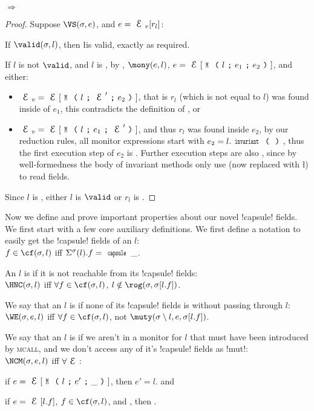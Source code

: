 \begin{theorem}\rm {} $\Rightarrow$ 
\end{theorem}\SS
\begin{proof}
\noindent Suppose $\VS(\s, e)$, and $e = \EV[r_l]$:
\begin{ienumerate}
	\item If $\valid(\s,l)$, then \l is valid, exactly as required.
	\item If $l$ is not $\valid$, and $l$ is \reach, by , $\mony(e,l)$, $e = \E[\M{l}{e_1}{e_2}]$, and either:
	\begin{itemize}
	 \item $\EV = \E[\M{l}{\E'}{e_2}]$, that is $r_l$ (which is not equal to $l$) was found inside of $e_1$, this contradicts the definition of \mony, or
	 \item $\EV = \E[\M{l}{e_1}{\E'}]$, and thus $r_l$ was found inside $e_2$,  by our reduction rules, all monitor expressions start with $e_2=l.\invariant$, thus the first execution step
	 of $e_2$ is \trusted. Further execution steps are also \trusted, since by well-formedness the body of invariant methods only use \Q@this@ (now replaced with \l) to read fields.
	\end{itemize}
\end{ienumerate}
Since $l$ is \reach, either $l$ is $\valid$ or $r_l$ is \trusted.
\end{proof}

Now we define and prove important properties about our novel \Q!capsule! fields. We first start with a few core auxiliary definitions. We first define a notation to easily get the \Q!capsule! fields of an $l$:\\
\indent $f \in \cf(\s, l)$ iff $\Ss(l).f = \Kw{capsule}\,\_$.

\noindent An $l$ is \HNC if it is not reachable from its \Q!capsule! fields:\\
\indent $\HNC(\s, l)$ iff $\forall f \in \cf(\s, l)$, $l \notin \rog(\s, \s[l.f])$.

\noindent We say that an $l$ is \WE if none of its \Q!capsule! fields is \muty without passing through $l$:\\
\indent $\WE(\s, e, l)$ iff $\forall f \in \cf(\s, l)$, not $\muty(\s\setminus l, e, \s[l.f])$.

\noindent We say that an $l$ is \NCM if we aren't in a monitor for $l$ that must have been introduced by \textsc{mcall}, and we don't access any of it's \Q!capsule! fields as \Q!mut!:\\
\indent $\NCM(\s, e, l)$ iff $\forall \E$:
\begin{iitemize}
\item if $e = \E[\M{l}{e'}{\_}]$, then $e' = l$. and
\item if $e = \E[l.f]$, $f \in \cf(\s, l)$, and , then .
\end{iitemize}

